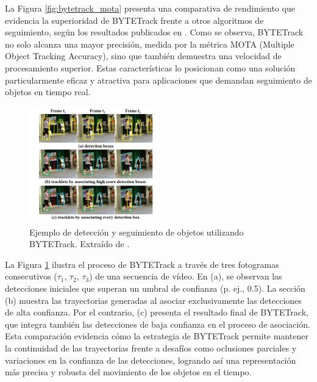 \documentclass[11pt,spanish,listoffigures,listoftables]{tfgetsinf}
\begin{document}
La Figura \ref{fig:bytetrack_mota} presenta una comparativa de rendimiento que evidencia la superioridad de BYTETrack frente a otros algoritmos de seguimiento, según los resultados publicados en \cite{zhang2022bytetrackmultiobjecttrackingassociating}. Como se observa, BYTETrack no solo alcanza una mayor precisión, medida por la métrica MOTA (Multiple Object Tracking Accuracy), sino que también demuestra una velocidad de procesamiento superior. Estas características lo posicionan como una solución particularmente eficaz y atractiva para aplicaciones que demandan seguimiento de objetos en tiempo real.

\begin{figure}[H]

   \centering
   \includegraphics[width=0.5\textwidth]{images/estado_del_arte/BYTETrack_deteccion.png}
   \caption[Ejemplo de detección y seguimiento de objetos utilizando BYTETrack]{Ejemplo de detección y seguimiento de objetos utilizando BYTETrack. Extraído de \cite[fig. 2, p.~2]{zhang2022bytetrackmultiobjecttrackingassociating}.}
   \label{fig:bytetrack_deteccion}
\end{figure}

La Figura \ref{fig:bytetrack_deteccion} ilustra el proceso de BYTETrack a través de tres fotogramas consecutivos ($\tau_1$, $\tau_2$, $\tau_3$) de una secuencia de vídeo. En (a), se observan las detecciones iniciales que superan un umbral de confianza (p. ej., 0.5). La sección (b) muestra las trayectorias generadas al asociar exclusivamente las detecciones de alta confianza. Por el contrario, (c) presenta el resultado final de BYTETrack, que integra también las detecciones de baja confianza en el proceso de asociación. Esta comparación evidencia cómo la estrategia de BYTETrack permite mantener la continuidad de las trayectorias frente a desafíos como oclusiones parciales y variaciones en la confianza de las detecciones, logrando así una representación más precisa y robusta del movimiento de los objetos en el tiempo.
\end{document}
